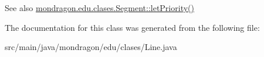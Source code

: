 \begin{DoxySeeAlso}{See also}
\mbox{\hyperlink{classmondragon_1_1edu_1_1clases_1_1_segment_af903bad2ccfd51fe2f8d21d437143a1e}{mondragon.\+edu.\+clases.\+Segment\+::let\+Priority()}} 
\end{DoxySeeAlso}


The documentation for this class was generated from the following file\+:\begin{DoxyCompactItemize}
\item 
src/main/java/mondragon/edu/clases/Line.\+java\end{DoxyCompactItemize}
